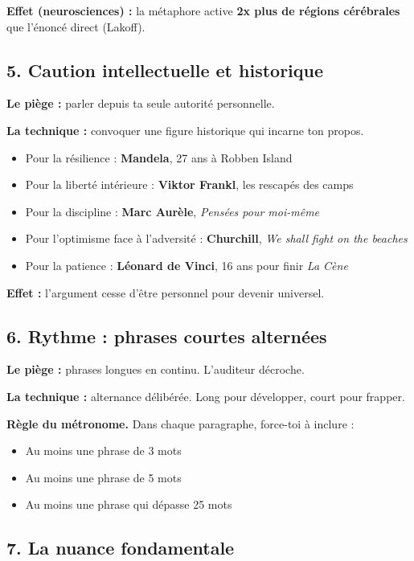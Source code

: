 \documentclass[11pt,a4paper]{article}
\begin{document}
\textbf{Effet (neurosciences) :} la métaphore active \textbf{2x plus de régions cérébrales} que l'énoncé direct (Lakoff).

\subsection{5. Caution intellectuelle et historique}

\textbf{Le piège :} parler depuis ta seule autorité personnelle.

\textbf{La technique :} convoquer une figure historique qui incarne ton propos.
\begin{itemize}[leftmargin=*, itemsep=2pt]
  \item Pour la résilience : \textbf{Mandela}, 27 ans à Robben Island
  \item Pour la liberté intérieure : \textbf{Viktor Frankl}, les rescapés des camps
  \item Pour la discipline : \textbf{Marc Aurèle}, \textit{Pensées pour moi-même}
  \item Pour l'optimisme face à l'adversité : \textbf{Churchill}, \textit{We shall fight on the beaches}
  \item Pour la patience : \textbf{Léonard de Vinci}, 16 ans pour finir \textit{La Cène}
\end{itemize}

\textbf{Effet :} l'argument cesse d'être personnel pour devenir universel.

\subsection{6. Rythme : phrases courtes alternées}

\textbf{Le piège :} phrases longues en continu. L'auditeur décroche.

\textbf{La technique :} alternance délibérée. Long pour développer, court pour frapper.

\textbf{Règle du métronome.} Dans chaque paragraphe, force-toi à inclure :
\begin{itemize}[leftmargin=*, itemsep=2pt]
  \item Au moins une phrase de 3 mots
  \item Au moins une phrase de 5 mots
  \item Au moins une phrase qui dépasse 25 mots
\end{itemize}

\subsection{7. La nuance fondamentale}
\end{document}
